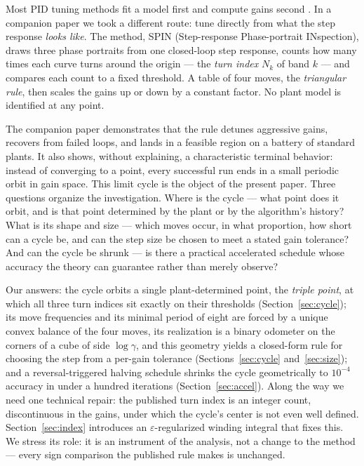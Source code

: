 \documentclass[letterpaper, 10pt, conference, twocolumn]{ieeeconf}
\begin{document}
Most PID tuning methods fit a model first and compute gains second
\cite{ZN1942,AstromHagglund2004}. In a companion paper \cite{Paper1} we took
a different route: tune directly from what the step response \emph{looks like}.
The method, SPIN (Step-response Phase-portrait INspection), draws three phase
portraits from one closed-loop step response, counts how many times each curve
turns around the origin --- the \emph{turn index} $N_k$ of band $k$ --- and
compares each count to a fixed threshold. A table of four moves, the
\emph{triangular rule}, then scales the gains up or down by a constant factor.
No plant model is identified at any point.

The companion paper demonstrates that the rule detunes aggressive gains,
recovers from failed loops, and lands in a feasible region on a battery of
standard plants. It also shows, without explaining, a characteristic terminal
behavior: instead of converging to a point, every successful run ends in a
small periodic orbit in gain space. This limit cycle is the object of the
present paper. Three questions organize the investigation. Where is the cycle
--- what point does it orbit, and is that point determined by the plant or by
the algorithm's history? What is its shape and size --- which moves occur, in
what proportion, how short can a cycle be, and can the step size be chosen to
meet a stated gain tolerance? And can the cycle be shrunk --- is there a
practical accelerated schedule whose accuracy the theory can guarantee rather
than merely observe?

Our answers: the cycle orbits a single plant-determined point, the
\emph{triple point}, at which all three turn indices sit exactly on their
thresholds (Section~\ref{sec:cycle}); its move frequencies and its minimal
period of eight are forced by a unique convex balance of the four moves, its
realization is a binary odometer on the corners of a cube of side
$\log\gamma$, and this geometry yields a closed-form rule for choosing the
step from a per-gain tolerance (Sections~\ref{sec:cycle}
and~\ref{sec:size}); and a reversal-triggered halving schedule shrinks the
cycle geometrically to $10^{-4}$ accuracy in under a hundred iterations
(Section~\ref{sec:accel}). Along the way we need one technical repair: the
published turn index is an integer count, discontinuous in the gains, under
which the cycle's center is not even well defined. Section~\ref{sec:index}
introduces an $\varepsilon$-regularized winding integral that fixes this. We
stress its role: it is an instrument of the analysis, not a change to the
method --- every sign comparison the published rule makes is unchanged.
\end{document}
